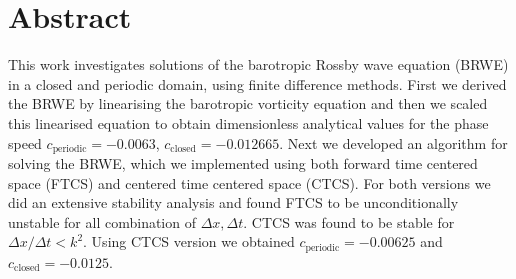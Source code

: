 \section*{Abstract}
This work investigates solutions of the barotropic Rossby wave equation (BRWE)
in a closed and periodic domain, using finite difference methods. First we
derived the BRWE  by linearising the barotropic vorticity equation and
then we scaled this linearised equation to obtain dimensionless analytical
values for the phase speed $c_{\mathrm{periodic}} = -0.0063$,
$c_{\mathrm{closed}} = -0.012665$. 
Next we developed an algorithm for solving the BRWE, which we implemented using
both forward time centered space (FTCS) and centered time centered space (CTCS).
For both versions we did an extensive stability analysis and found FTCS to be
unconditionally unstable for all combination of $\Delta x, \Delta t$. CTCS was
found to be stable for $\Delta x / \Delta t < k^2$. Using CTCS version we
obtained $c_{\mathrm{periodic}}= - 0.00625$ and $c_{\mathrm{closed}} = -
0.0125$.  
